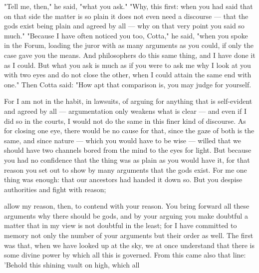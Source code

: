  "Tell me, then," he said, "what you ask." "Why, this first: when you had said that on that side the matter is so plain it does not even need a discourse — that the gods exist being plain and agreed by all — why on that very point you said so much." "Because I have often noticed you too, Cotta," he said, "when you spoke in the Forum, loading the juror with as many arguments as you could, if only the case gave you the means. And philosophers do this same thing, and I have done it as I could. But what you ask is much as if you were to ask me why I look at you with two eyes and do not close the other, when I could attain the same end with one." Then Cotta said: "How apt that comparison is, you may judge for yourself.

 For I am not in the habit, in lawsuits, of arguing for anything that is self-evident and agreed by all — argumentation only weakens what is clear — and even if I did so in the courts, I would not do the same in this finer kind of discourse. As for closing one eye, there would be no cause for that, since the gaze of both is the same, and since nature — which you would have to be wise — willed that we should have two channels bored from the mind to the eyes for light. But because you had no confidence that the thing was as plain as you would have it, for that reason you set out to show by many arguments that the gods exist. For me one thing was enough: that our ancestors had handed it down so. But you despise authorities and fight with reason;

 allow my reason, then, to contend with your reason. You bring forward all these arguments why there should be gods, and by your arguing you make doubtful a matter that in my view is not doubtful in the least; for I have committed to memory not only the number of your arguments but their order as well. The first was that, when we have looked up at the sky, we at once understand that there is some divine power by which all this is governed. From this came also that line: 'Behold this shining vault on high, which all

